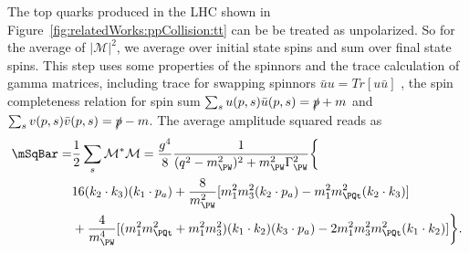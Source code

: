 \noindent The top quarks produced in the LHC shown in Figure~\ref{fig:relatedWorks:ppCollision:tt} can be be treated as unpolarized. So for the average of $|\mathcal{M}|^2$, we average over initial state spins and sum over final state spins. This step uses some properties of the spinnors and the trace calculation of gamma matrices, including trace for swapping spinnors $\bar{u} u = Tr[ u \bar{u}] $ , the spin completeness relation for spin sum $\sum_s u(p,s) \bar{u}(p,s) = \slashed{p} + m $  and $\sum_s v(p,s) \bar{v}(p,s) = \slashed{p} - m$. The average amplitude squared reads as
\begin{equation}
\begin{split}
	\mSqBar = & \frac{1}{2} \sum_s \mathcal{M}^* \mathcal{M} =
	\frac{g^4}{8} \frac{1}{ (q^2-m^2_{\PW})^2 +  m^2_{\PW} \Gamma^2_{\PW} } \bigg \{  \\
	& 16  (  k_2 \cdot k_3) (  k_1 \cdot p_a) + \frac{8}{m^2_{\PW}} [ m_1^2 m_3^2 (k_2 \cdot p_a) - m_1^2 m_\PQt^2 (k_2 \cdot k_3)] \\
	&  + \frac{4}{m^4_{\PW}} [ (m_1^2 m_\PQt^2 + m_1^2 m_3^2) (k_1 \cdot k_2) (k_3 \cdot p_a) - 2  m_1^2 m_3^2 m_\PQt^2  (k_1 \cdot k_2) ]\bigg\} .
\end{split}
\end{equation}

